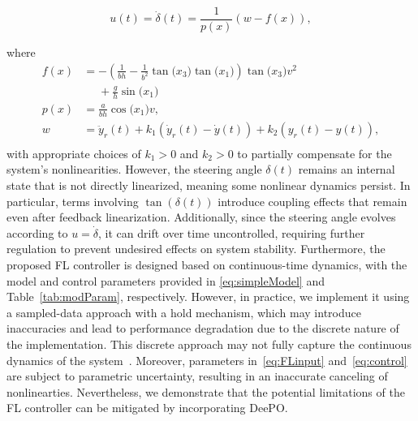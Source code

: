 \begin{equation}
    u(t) = \dot{\delta}(t) = \frac{1}{p(x)}(w - f(x)),
    \label{eq:FLinput}
\end{equation}

where 
\begin{align}
\label{eq:control}
    f(x)&= - \left(\frac{1}{bh}- \frac{1}{b^2}\tan\big(x_3\big) \tan\big(x_1\big)\right)\tan\big(x_3\big)v^2 \nonumber \\
      &\phantom{=} + \frac{g}{h}\sin\big(x_1\big) \nonumber \\
    p(x) & =\frac{a}{bh}\cos\big(x_1\big)v, \nonumber \\
    w & =  \ddot y_r(t) + k_1\left(\dot y_r(t)-\dot y(t)\right) +k_2 \left(y_r(t)-y(t)\right),\\ \nonumber
\end{align}
with appropriate choices of $k_1 > 0$ and $k_2 > 0$ to partially compensate for the system's nonlinearities. However, the steering angle $\delta(t)$ remains an internal state that is not directly linearized, meaning some nonlinear dynamics persist. In particular, terms involving $\tan(\delta(t))$ introduce coupling effects that remain even after feedback linearization. Additionally, since the steering angle evolves according to $u = \dot{\delta}$, it can drift over time uncontrolled, requiring further regulation to prevent undesired effects on system stability.
Furthermore, the proposed FL controller is designed based on continuous-time dynamics, with the model and control parameters provided in \eqref{eq:simpleModel} and Table~\ref{tab:modParam}, respectively. However, in practice, we implement it using a sampled-data approach with a hold mechanism, which may introduce inaccuracies and lead to performance degradation due to the discrete nature of the implementation. This discrete approach may not fully capture the continuous dynamics of the system~\cite{kimber1991sampled, grizzle1988feedback}. Moreover, parameters in~\eqref{eq:FLinput} and~\eqref{eq:control} are subject to parametric uncertainty, resulting in an inaccurate canceling of nonlinearties.  Nevertheless, we demonstrate that the potential limitations of the FL controller can be mitigated by incorporating DeePO.

